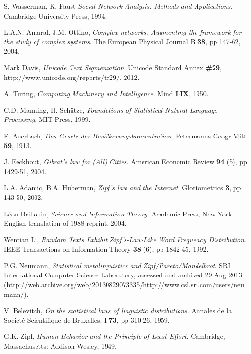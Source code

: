 \begin{thebibliography}{99}
  S. Wasserman, K. Faust
  \emph{Social Network Analysis: Methods and Applications}.
  Cambridge University Press,
  1994.

	L.A.N. Amaral, J.M. Ottino,
	\emph{Complex networks. Augmenting the framework for the study of complex systems}.
	The European Physical Journal B \textbf{38}, pp 147-62,
	2004.
	
  Mark Davis,
  \emph{Unicode Text Segmentation}.
  Unicode Standard Annex \textbf{\#29}, http://www.unicode.org/reports/tr29/,
  2012.
  
  A. Turing,
  \emph{Computing Machinery and Intelligence}.
  Mind \textbf{LIX},
  1950.

  C.D. Manning, H. Schütze,
  \emph{Foundations of Statistical Natural Language Processing}.
  MIT Press,
  1999.

  F. Auerbach,
  \emph{Das Gesetz der Bevölkerungskonzentration}.
  Petermanns Geogr Mitt \textbf{59},
  1913.

  J. Eeckhout,
  \emph{Gibrat's law for (All) Cities}.
  American Economic Review \textbf{94} (5), pp 1429-51,
  2004.

  L.A. Adamic, B.A. Huberman,
  \emph{Zipf’s law and the Internet}.
  Glottometrics \textbf{3}, pp 143-50,
  2002.

  Léon Brillouin,
  \emph{Science and Information Theory}.
  Academic Press, New York,
  English translation of 1988 reprint,
  2004.

  Wentian Li,
  \emph{Random Texts Exhibit Zipf's-Law-Like Word Frequency Distribution}.
  IEEE Transactions on Information Theory \textbf{38} (6), pp 1842-45,
  1992.

  P.G. Neumann,
  \emph{Statistical metalinguistics and Zipf/Pareto/Mandelbrot}.
  SRI International Computer Science Laboratory,
  accessed and archived 29 Aug 2013 (http://web.archive.org/web/20130829073335/http://www.csl.sri.com/users/neumann/).

  V. Belevitch,
  \emph{On the statistical laws of linguistic distributions}.
  Annales de la Société Scientifique de Bruxelles. I \textbf{73}, pp 310-26,
  1959.

  G.K. Zipf,
  \emph{Human Behavior and the Principle of Least Effort}.
  Cambridge, Massachusetts: Addison-Wesley,
  1949.


\end{thebibliography}
